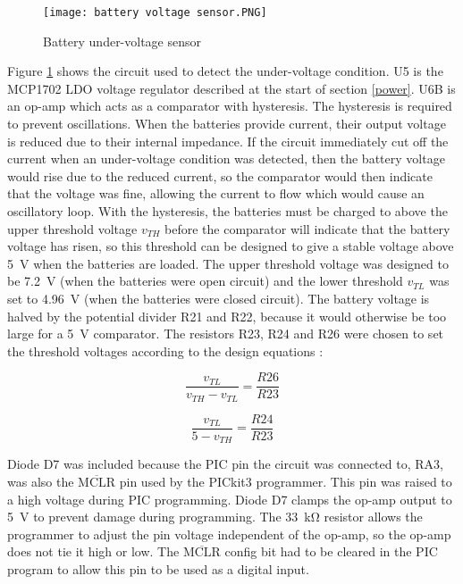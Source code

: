 \begin{figure}[htbp]
	\centering
	\texttt{[image: battery voltage sensor.PNG]}
	\caption{Battery under-voltage sensor}
	\label{fig: battery voltage sensor}
\end{figure}

Figure \ref{fig: battery voltage sensor} shows the circuit used to detect the under-voltage condition. U5 is the MCP1702 LDO voltage regulator described at the start of section \ref{power}. U6B is an op-amp which acts as a comparator with hysteresis. The hysteresis is required to prevent oscillations. When the batteries provide current, their output voltage is reduced due to their internal impedance. If the circuit immediately cut off the current when an under-voltage condition was detected, then the battery voltage would rise due to the reduced current, so the comparator would then indicate that the voltage was fine, allowing the current to flow which would cause an oscillatory loop. With the hysteresis, the batteries must be charged to above the upper threshold voltage $v_{TH}$ before the comparator will indicate that the battery voltage has risen, so this threshold can be designed to give a stable voltage above \SI{5}{\volt} when the batteries are loaded. The upper threshold voltage was designed to be \SI{7.2}{\volt} (when the batteries were open circuit) and the lower threshold $v_{TL}$ was set to \SI{4.96}{\volt} (when the batteries were closed circuit). The battery voltage is halved by the potential divider R21 and R22, because it would otherwise be too large for a \SI{5}{\volt} comparator. The resistors R23, R24 and R26 were chosen to set the threshold voltages according to the design equations \cite{hysteresis}:
\begin{multicols}{2}
\begin{equation}
\frac{v_{TL}}{v_{TH} - v_{TL}} = \frac{R26}{R23}
\end{equation}

\begin{equation}
\frac{v_{TL}}{5 - v_{TH}} = \frac{R24}{R23}
\end{equation}
\end{multicols}

Diode D7 was included because the PIC pin the circuit was connected to, RA3, was also the $\overline{\text{MCLR}}$ pin used by the PICkit3 programmer. This pin was raised to a high voltage during PIC programming. Diode D7 clamps the op-amp output to \SI{5}{\volt} to prevent damage during programming. The \SI{33}{\kilo\ohm} resistor allows the programmer to adjust the pin voltage independent of the op-amp, so the op-amp does not tie it high or low. The $\overline{\text{MCLR}}$ config bit had to be cleared in the PIC program to allow this pin to be used as a digital input. \\


